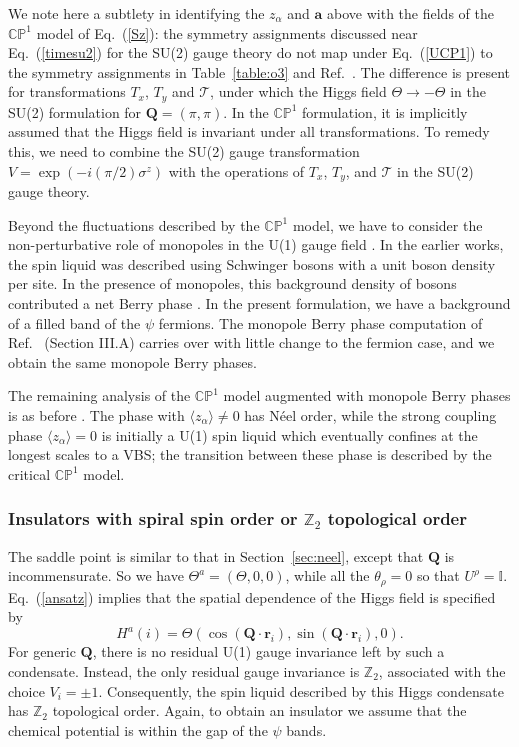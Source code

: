 \documentclass[aps,prb,preprint,onecolumn,citeautoscript,superscriptaddress,footinbib,
eqsecnum]{revtex4-1}
\newcommand{\beq}{\begin{equation}}
\newcommand{\eeq}{\end{equation}}
\begin{document}
We note here a subtlety in identifying the $z_\alpha$ and ${\bm a}$ above with the fields
of the $\mathbb{CP}^1$ model of Eq.~(\ref{Sz}): the symmetry assignments discussed near Eq.~(\ref{timesu2}) for the SU(2) gauge theory do not map under Eq.~(\ref{UCP1}) to the symmetry assignments in
Table~\ref{table:o3} and Ref.~. The difference is 
present for transformations $T_x$, $T_y$ and $\mathcal{T}$, under which the Higgs field $\Theta \rightarrow -\Theta$ in the SU(2) formulation for ${\bm Q} = (\pi, \pi)$. 
In the $\mathbb{CP}^1$ formulation,
it is implicitly assumed that the Higgs field is invariant under all transformations. 
To remedy this, we need to combine 
the SU(2) gauge transformation $V = \exp(-i (\pi/2) \sigma^z)$ with the operations of 
$T_x$, $T_y$, and $\mathcal{T}$ in the SU(2) gauge theory.

Beyond the fluctuations described by the $\mathbb{CP}^1$ model, we have to consider the non-perturbative role of monopoles 
in the U(1) gauge field \cite{NRSS89,NRSS90}. In the earlier works, the spin liquid was described using Schwinger bosons with
a unit boson density per site. In the presence of monopoles, this background density of bosons contributed a net Berry phase \cite{NRSS90}. In the present formulation, we have a background of a filled band of the $\psi$ fermions. The monopole Berry phase computation of
Ref.~ (Section III.A) carries over with little change to the fermion case, and we obtain the same monopole Berry phases.

The remaining analysis of the $\mathbb{CP}^1$ model augmented with monopole Berry phases is as before \cite{NRSS89,NRSS90,senthil1,senthil2}. The phase with $\langle z_\alpha \rangle \neq 0$ has N\'eel order,
while the strong coupling phase $\langle z_\alpha \rangle = 0$ is initially a U(1) spin liquid which eventually
confines at the longest scales to a VBS; the transition between these phase is described by the critical $\mathbb{CP}^1$ model.

\subsubsection{Insulators with spiral spin order or $\mathbb{Z}_2$ topological order}
\label{sec:spiral}

The saddle point is similar to that in Section~\ref{sec:neel}, except that ${\bm Q}$ is incommensurate. 
So we have $\Theta^a = (\Theta, 0, 0)$, while all the $\theta_\rho = 0$ so that $U^\rho = \mathbb{I}$.
Eq.~(\ref{ansatz}) implies that the spatial dependence of the Higgs field is specified by
\beq
H^a (i) = \Theta ( \cos({\bm Q} \cdot {\bm r}_i ),  \sin({\bm Q} \cdot {\bm r}_i ), 0). \label{Hspiral}
\eeq
For generic ${\bm Q}$, there is no residual U(1) gauge invariance left by such a condensate. Instead,
the only residual gauge invariance is $\mathbb{Z}_2$, associated with the choice $V_i = \pm 1$. Consequently, the spin liquid
described by this Higgs condensate has $\mathbb{Z}_2$ topological order. Again, to obtain an insulator we assume that the 
chemical potential is within the gap of the $\psi$ bands.
\end{document}
